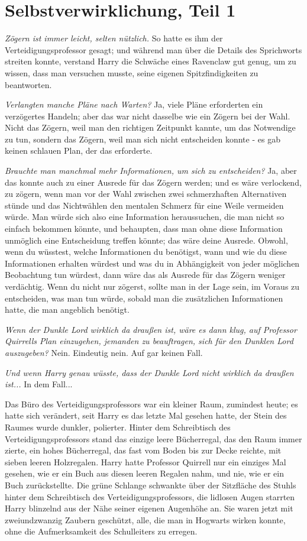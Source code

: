 \chapter{Selbstverwirklichung, Teil 1}

\emph{Zögern ist immer leicht, selten nützlich.} So hatte es ihm der
Verteidigungsprofessor gesagt; und während man über die Details des Sprichworts
streiten konnte, verstand Harry die Schwäche eines Ravenclaw gut genug, um zu
wissen, dass man versuchen musste, seine eigenen Spitzfindigkeiten zu
beantworten.

\emph{Verlangten manche Pläne nach Warten? }
Ja, viele Pläne erforderten ein verzögertes Handeln; aber das war nicht dasselbe
wie ein Zögern bei der Wahl. Nicht das Zögern, weil man den richtigen Zeitpunkt
kannte, um das Notwendige zu tun, sondern das Zögern, weil man sich nicht
entscheiden konnte - es gab keinen schlauen Plan, der das erforderte.

\emph{Brauchte man manchmal mehr Informationen, um sich zu entscheiden? }
Ja, aber das konnte auch zu einer Ausrede für das Zögern werden; und es wäre
verlockend, zu zögern, wenn man vor der Wahl zwischen zwei schmerzhaften
Alternativen stünde und das Nichtwählen den mentalen Schmerz für eine Weile
vermeiden würde. Man würde sich also eine Information heraussuchen, die man
nicht so einfach bekommen könnte, und behaupten, dass man ohne diese Information
unmöglich eine Entscheidung treffen könnte; das wäre deine Ausrede. Obwohl, wenn
du wüsstest, welche Informationen du benötigst, wann und wie du diese
Informationen erhalten würdest und was du in Abhängigkeit von jeder möglichen
Beobachtung tun würdest, dann wäre das als Ausrede für das Zögern weniger
verdächtig. Wenn du nicht nur zögerst, sollte man in der Lage sein, im Voraus zu
entscheiden, was man tun würde, sobald man die zusätzlichen Informationen hatte,
die man angeblich benötigt.

\emph{Wenn der Dunkle Lord wirklich da draußen ist, wäre es dann klug, auf Professor Quirrells Plan einzugehen, jemanden zu beauftragen, sich für den Dunklen Lord auszugeben? }
Nein. Eindeutig nein. Auf gar keinen Fall.

\emph{Und wenn Harry genau wüsste, dass der Dunkle Lord nicht wirklich da
draußen ist...} In dem Fall...

Das Büro des Verteidigungsprofessors war ein kleiner Raum, zumindest heute; es
hatte sich verändert, seit Harry es das letzte Mal gesehen hatte, der Stein des
Raumes wurde dunkler, polierter. Hinter dem Schreibtisch des
Verteidigungsprofessors stand das einzige leere Bücherregal, das den Raum immer
zierte, ein hohes Bücherregal, das fast vom Boden bis zur Decke reichte, mit
sieben leeren Holzregalen. Harry hatte Professor Quirrell nur ein einziges Mal
gesehen, wie er ein Buch aus diesen leeren Regalen nahm, und nie, wie er ein
Buch zurückstellte. Die grüne Schlange schwankte über der Sitzfläche des Stuhls
hinter dem Schreibtisch des Verteidigungsprofessors, die lidlosen Augen starrten
Harry blinzelnd aus der Nähe seiner eigenen Augenhöhe an. Sie waren jetzt mit
zweiundzwanzig Zaubern geschützt, alle, die man in Hogwarts wirken konnte, ohne
die Aufmerksamkeit des Schulleiters zu erregen.


